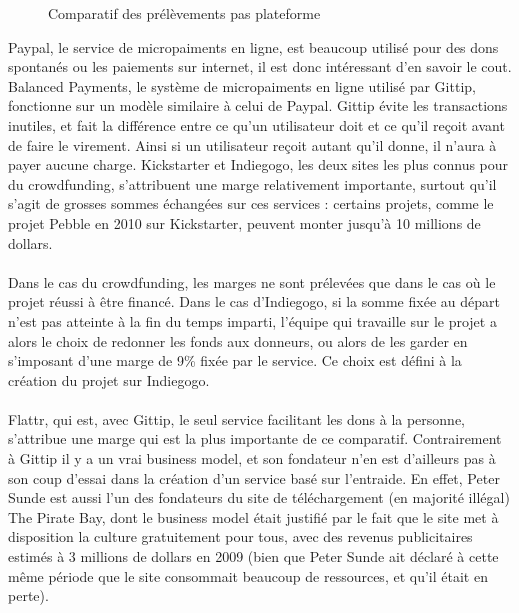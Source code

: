 \begin{figure}[h!]
    \caption{Comparatif des prélèvements pas plateforme}
\end{figure}

Paypal, le service de micropaiments en ligne,  est beaucoup utilisé pour des
dons spontanés ou les paiements sur internet, il est donc intéressant d'en
savoir le cout. Balanced Payments, le système de micropaiments en ligne utilisé
par Gittip, fonctionne sur un modèle similaire à celui de Paypal. Gittip évite
les transactions inutiles, et fait la différence entre ce qu'un utilisateur
doit et ce qu'il reçoit avant de faire le virement. Ainsi si un utilisateur
reçoit autant qu'il donne, il n'aura à payer aucune charge. Kickstarter et
Indiegogo, les deux sites les plus connus pour du crowdfunding, s'attribuent
une marge relativement importante, surtout qu'il s'agit de grosses sommes
échangées sur ces services : certains projets, comme le projet Pebble en 2010
sur Kickstarter, peuvent monter jusqu'à 10 millions de dollars.

\paragraph{}
Dans le cas du crowdfunding, les marges ne sont prélevées que dans le cas où le
projet réussi à être financé. Dans le cas d'Indiegogo, si la somme fixée au
départ n'est pas atteinte à la fin du temps imparti, l'équipe qui travaille sur
le projet a alors le choix de redonner les fonds aux donneurs, ou alors de les
garder en s'imposant d'une marge de 9\%{} fixée par le service. Ce choix est
défini à la création du projet sur Indiegogo.

\paragraph{}
Flattr, qui est, avec Gittip, le seul service facilitant les dons à la
personne, s'attribue une marge qui est la plus importante de ce comparatif.
Contrairement à Gittip il y a un vrai business model, et son fondateur n'en est
d'ailleurs pas à son coup d'essai dans la création d'un service basé sur
l'entraide. En effet, Peter Sunde est aussi l'un des fondateurs du site de
téléchargement (en majorité illégal) The Pirate Bay, dont le business model
était justifié par le fait que le site met à disposition la culture
gratuitement pour tous, avec des revenus publicitaires estimés à 3 millions de
dollars en 2009 (bien que Peter Sunde ait déclaré à cette même période que le
site consommait beaucoup de ressources, et qu'il était en perte).

